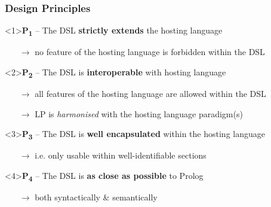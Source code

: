 \documentclass[presentation]{beamer}
\begin{document}
\begin{frame}%
    \frametitle{Design Principles}

    \begin{block}<1>{\textbf{P\textsubscript{1}} -- The DSL \textbf{strictly extends} the hosting language}
        \begin{itemize}
            \item[$\rightarrow$] no feature of the hosting language is forbidden within the DSL
        \end{itemize}
    \end{block}

    \begin{block}<2>{\textbf{P\textsubscript{2}} -- The DSL is \textbf{interoperable} with hosting language}
        \begin{itemize}
            \item[$\rightarrow$] all features of the hosting language are allowed within the DSL
            \item[$\rightarrow$] LP is \emph{harmonised} with the hosting language paradigm(s)
        \end{itemize}
    \end{block}

    \begin{block}<3>{\textbf{P\textsubscript{3}} -- The DSL is \textbf{well encapsulated} within the hosting language}
        \begin{itemize}
            \item[$\rightarrow$] i.e. only usable within well-identifiable sections
        \end{itemize}
    \end{block}

    \begin{block}<4>{\textbf{P\textsubscript{4}} -- The DSL is \textbf{as close as possible} to Prolog}
        \begin{itemize}
            \item[$\rightarrow$] both syntactically \& semantically
        \end{itemize}
    \end{block}

\end{frame}
\end{document}
